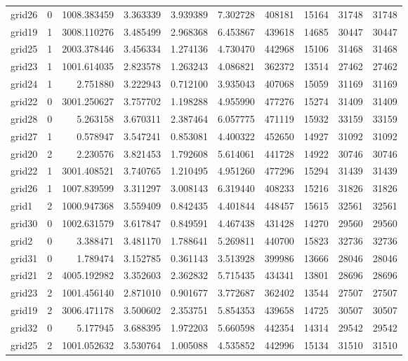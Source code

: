 \documentclass[../../../thesis.tex]{subfiles}
\begin{document}
\begin{longtable}{|l|r|r|r|r|r|r|r|r|r|}
grid26 & 0 & 1008.383459 & 3.363339 & 3.939389 & 7.302728 & 408181 & 15164 & 31748 & 31748 \\
grid19 & 1 & 3008.110276 & 3.485499 & 2.968368 & 6.453867 & 439618 & 14685 & 30447 & 30447 \\
grid25 & 1 & 2003.378446 & 3.456334 & 1.274136 & 4.730470 & 442968 & 15106 & 31468 & 31468 \\
grid23 & 1 & 1001.614035 & 2.823578 & 1.263243 & 4.086821 & 362372 & 13514 & 27462 & 27462 \\
grid24 & 1 & 2.751880 & 3.222943 & 0.712100 & 3.935043 & 407068 & 15059 & 31169 & 31169 \\
grid22 & 0 & 3001.250627 & 3.757702 & 1.198288 & 4.955990 & 477276 & 15274 & 31409 & 31409 \\
grid28 & 0 & 5.263158 & 3.670311 & 2.387464 & 6.057775 & 471119 & 15932 & 33159 & 33159 \\
grid27 & 1 & 0.578947 & 3.547241 & 0.853081 & 4.400322 & 452650 & 14927 & 31092 & 31092 \\
grid20 & 2 & 2.230576 & 3.821453 & 1.792608 & 5.614061 & 441728 & 14922 & 30746 & 30746 \\
grid22 & 1 & 3001.408521 & 3.740765 & 1.210495 & 4.951260 & 477296 & 15294 & 31439 & 31439 \\
grid26 & 1 & 1007.839599 & 3.311297 & 3.008143 & 6.319440 & 408233 & 15216 & 31826 & 31826 \\
grid1 & 2 & 1000.947368 & 3.559409 & 0.842435 & 4.401844 & 448457 & 15615 & 32561 & 32561 \\
grid30 & 0 & 1002.631579 & 3.617847 & 0.849591 & 4.467438 & 431428 & 14270 & 29560 & 29560 \\
grid2 & 0 & 3.388471 & 3.481170 & 1.788641 & 5.269811 & 440700 & 15823 & 32736 & 32736 \\
grid31 & 0 & 1.789474 & 3.152785 & 0.361143 & 3.513928 & 399986 & 13666 & 28046 & 28046 \\
grid21 & 2 & 4005.192982 & 3.352603 & 2.362832 & 5.715435 & 434341 & 13801 & 28696 & 28696 \\
grid23 & 2 & 1001.456140 & 2.871010 & 0.901677 & 3.772687 & 362402 & 13544 & 27507 & 27507 \\
grid19 & 2 & 3006.471178 & 3.500602 & 2.353751 & 5.854353 & 439658 & 14725 & 30507 & 30507 \\
grid32 & 0 & 5.177945 & 3.688395 & 1.972203 & 5.660598 & 442354 & 14314 & 29542 & 29542 \\
grid25 & 2 & 1001.052632 & 3.530764 & 1.005088 & 4.535852 & 442996 & 15134 & 31510 & 31510 \\

\end{longtable}
\end{document}
